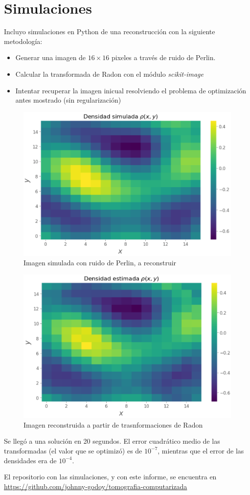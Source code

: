 \section{Simulaciones}
Incluyo simulaciones en Python de una reconstrucción con la siguiente metodología:
\begin{itemize}
    \item Generar una imagen de $16\times 16$ pixeles a través de ruido de Perlin.
    \item Calcular la transformada de Radon con el módulo \textit{scikit-image} \citep{scikit-image}
    \item Intentar recuperar la imagen inicual resolviendo el problema de optimización antes mostrado (sin regularización)
\end{itemize}
\begin{figure}
    \centering
    \includegraphics[scale=0.4]{img/simulada.png}
    \caption{Imagen simulada con ruido de Perlin, a reconstruir}
    \label{fig:simulada}
\end{figure}
\begin{figure}
    \centering
    \includegraphics[scale=0.4]{img/estimada.png}
    \caption{Imagen reconstruida a partir de trasnformaciones de Radon}
    \label{fig:estimada}
\end{figure}
Se llegó a una solución en 20 segundos. El error cuadrático medio de las transformadas (el valor que se optimizó) es de $10^{-7}$, mientras que el error de las densidades era de $10^{-4}$.

El repositorio con las simulaciones, y con este informe, se encuentra en \href{https://github.com/johnny-godoy/tomografia-computarizada}{https://github.com/johnny-godoy/tomografia-computarizada}

 